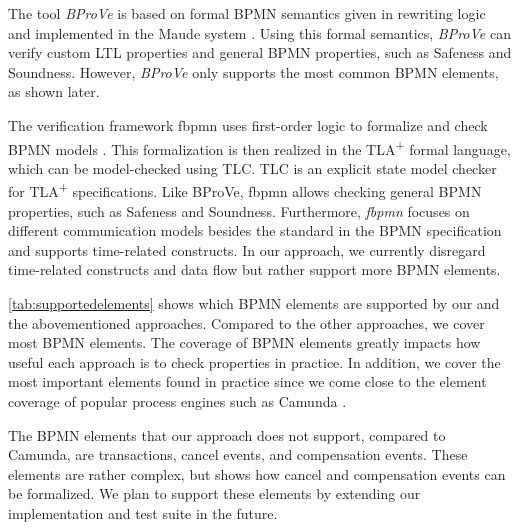 \documentclass{lmcs} %
\begin{document}
The tool \textit{BProVe} is based on formal BPMN semantics given in rewriting logic and implemented in the Maude system \cite{corradiniFormalApproachAnalysis2021}.
Using this formal semantics, \textit{BProVe} can verify custom LTL properties and general BPMN properties, such as Safeness and Soundness.
However, \textit{BProVe} only supports the most common BPMN elements, as shown later.

The verification framework \textsf{fbpmn} uses first-order logic to formalize and check BPMN models \cite{houhouFirstOrderLogicVerification2022}.
This formalization is then realized in the TLA\textsuperscript{+} formal language, which can be model-checked using TLC.
TLC is an explicit state model checker for TLA\textsuperscript{+} specifications.
Like BProVe, \textsf{fbpmn} allows checking general BPMN properties, such as Safeness and Soundness.
Furthermore, \textit{fbpmn} focuses on different communication models besides the standard in the BPMN specification and supports time-related constructs.
In our approach, we currently disregard time-related constructs \cite{duranVerifyingTimedBPMN2017,houhouFirstOrderLogicVerification2022} and data flow \cite{corradiniFormalisingAnimatingMultiple2022,el-saberCMMICMComplianceChecking2015} but rather support more BPMN elements.

\autoref{tab:supportedelements} shows which BPMN elements are supported by our and the abovementioned approaches.
Compared to the other approaches, we cover most BPMN elements.
The coverage of BPMN elements greatly impacts how useful each approach is to check properties in practice.
In addition, we cover the most important elements found in practice since we come close to the element coverage of popular process engines such as Camunda \cite{camundaservicesgmbhBPMNImplementationReference2023}.

The BPMN elements that our approach does not support, compared to Camunda, are transactions, cancel events, and compensation events.
These elements are rather complex, but \cite{vangorpVisualTokenbasedFormalization2013} shows how cancel and compensation events can be formalized.
We plan to support these elements by extending our implementation and test suite in the future.
\end{document}
